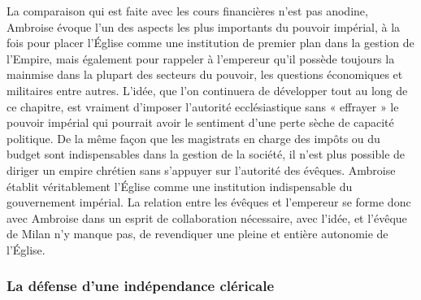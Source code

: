 La comparaison qui est faite avec les cours financières n’est pas anodine, Ambroise évoque l’un des aspects les plus importants du pouvoir impérial, à la fois pour placer l’Église comme une institution de premier plan dans la gestion de l’Empire, mais également pour rappeler à l’empereur qu’il possède toujours la mainmise dans la plupart des secteurs du pouvoir, les questions économiques et militaires entre autres. L’idée, que l'on continuera de développer tout au long de ce chapitre, est vraiment d’imposer l’autorité ecclésiastique sans « effrayer » le pouvoir impérial qui pourrait avoir le sentiment d’une perte sèche de capacité politique. De la même façon que les magistrats en charge des impôts ou du budget sont indispensables dans la gestion de la société, il n’est plus possible de diriger un empire chrétien sans s’appuyer sur l’autorité des évêques. Ambroise établit véritablement l’Église comme une institution indispensable du gouvernement impérial. La relation entre les évêques et l’empereur se forme donc avec Ambroise dans un esprit de collaboration nécessaire, avec l’idée, et l’évêque de Milan n’y manque pas, de revendiquer une pleine et entière autonomie de l’Église.

\bigskip

\subsubsection{La défense d'une indépendance cléricale}

